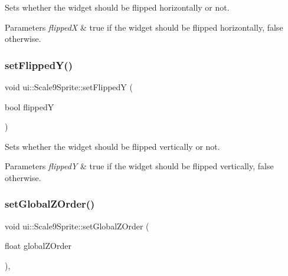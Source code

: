 Sets whether the widget should be flipped horizontally or not.


\begin{DoxyParams}{Parameters}
{\em flippedX} & true if the widget should be flipped horizontally, false otherwise. \\
\hline
\end{DoxyParams}
\mbox{\label{classui_1_1Scale9Sprite_a7e6cb973788a7147d7bf69d1668b88ec}} 
\subsubsection{\texorpdfstring{set\+Flipped\+Y()}{setFlippedY()}}
{\footnotesize\ttfamily void ui\+::\+Scale9\+Sprite\+::set\+FlippedY (\begin{DoxyParamCaption}\item[{bool}]{flippedY }\end{DoxyParamCaption})\hspace{0.3cm}{\ttfamily [virtual]}}

Sets whether the widget should be flipped vertically or not.


\begin{DoxyParams}{Parameters}
{\em flippedY} & true if the widget should be flipped vertically, false otherwise. \\
\hline
\end{DoxyParams}
\mbox{\label{classui_1_1Scale9Sprite_a7347765b62bbd3f21677e25e1ca164a3}} 
\subsubsection{\texorpdfstring{set\+Global\+Z\+Order()}{setGlobalZOrder()}}
{\footnotesize\ttfamily void ui\+::\+Scale9\+Sprite\+::set\+Global\+Z\+Order (\begin{DoxyParamCaption}\item[{float}]{global\+Z\+Order }\end{DoxyParamCaption})\hspace{0.3cm}{\ttfamily [override]}, {\ttfamily [virtual]}}

